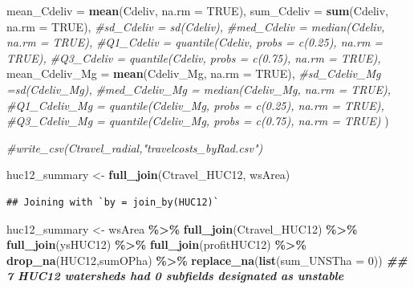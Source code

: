 \documentclass[
]{article}
\newenvironment{Shaded}{\begin{snugshade}}{\end{snugshade}}
\newcommand{\AttributeTok}[1]{\textcolor[rgb]{0.13,0.29,0.53}{#1}}
\newcommand{\CommentTok}[1]{\textcolor[rgb]{0.56,0.35,0.01}{\textit{#1}}}
\newcommand{\ConstantTok}[1]{\textcolor[rgb]{0.56,0.35,0.01}{#1}}
\newcommand{\DecValTok}[1]{\textcolor[rgb]{0.00,0.00,0.81}{#1}}
\newcommand{\DocumentationTok}[1]{\textcolor[rgb]{0.56,0.35,0.01}{\textbf{\textit{#1}}}}
\newcommand{\FunctionTok}[1]{\textcolor[rgb]{0.13,0.29,0.53}{\textbf{#1}}}
\newcommand{\NormalTok}[1]{#1}
\newcommand{\OtherTok}[1]{\textcolor[rgb]{0.56,0.35,0.01}{#1}}
\newcommand{\SpecialCharTok}[1]{\textcolor[rgb]{0.81,0.36,0.00}{\textbf{#1}}}
\begin{document}
\begin{Shaded}
\begin{Highlighting}[]
            \AttributeTok{mean\_Cdeliv =} \FunctionTok{mean}\NormalTok{(Cdeliv, }\AttributeTok{na.rm =} \ConstantTok{TRUE}\NormalTok{),}
            \AttributeTok{sum\_Cdeliv =} \FunctionTok{sum}\NormalTok{(Cdeliv, }\AttributeTok{na.rm =} \ConstantTok{TRUE}\NormalTok{),}
            \CommentTok{\#sd\_Cdeliv = sd(Cdeliv),}
            \CommentTok{\#med\_Cdeliv = median(Cdeliv, na.rm = TRUE),}
            \CommentTok{\#Q1\_Cdeliv = quantile(Cdeliv, probs = c(0.25), na.rm = TRUE),}
            \CommentTok{\#Q3\_Cdeliv = quantile(Cdeliv, probs = c(0.75), na.rm = TRUE),}
            \AttributeTok{mean\_Cdeliv\_Mg =} \FunctionTok{mean}\NormalTok{(Cdeliv\_Mg, }\AttributeTok{na.rm =} \ConstantTok{TRUE}\NormalTok{),}
            \CommentTok{\#sd\_Cdeliv\_Mg =sd(Cdeliv\_Mg),}
            \CommentTok{\#med\_Cdeliv\_Mg = median(Cdeliv\_Mg, na.rm = TRUE),}
            \CommentTok{\#Q1\_Cdeliv\_Mg = quantile(Cdeliv\_Mg, probs = c(0.25), na.rm = TRUE),}
            \CommentTok{\#Q3\_Cdeliv\_Mg = quantile(Cdeliv\_Mg, probs = c(0.75), na.rm = TRUE)}
\NormalTok{  )}

\CommentTok{\#write\_csv(Ctravel\_radial,"travelcosts\_byRad.csv")}
\end{Highlighting}
\end{Shaded}

\begin{Shaded}
\begin{Highlighting}[]
\NormalTok{huc12\_summary }\OtherTok{\textless{}{-}} \FunctionTok{full\_join}\NormalTok{(Ctravel\_HUC12, wsArea)}
\end{Highlighting}
\end{Shaded}

\begin{verbatim}
## Joining with `by = join_by(HUC12)`
\end{verbatim}

\begin{Shaded}
\begin{Highlighting}[]
\NormalTok{huc12\_summary }\OtherTok{\textless{}{-}}\NormalTok{ wsArea }\SpecialCharTok{\%\textgreater{}\%}
  \FunctionTok{full\_join}\NormalTok{(Ctravel\_HUC12) }\SpecialCharTok{\%\textgreater{}\%}
  \FunctionTok{full\_join}\NormalTok{(ysHUC12) }\SpecialCharTok{\%\textgreater{}\%}
  \FunctionTok{full\_join}\NormalTok{(profitHUC12) }\SpecialCharTok{\%\textgreater{}\%}
  \FunctionTok{drop\_na}\NormalTok{(HUC12,sumOPha) }\SpecialCharTok{\%\textgreater{}\%}
  \FunctionTok{replace\_na}\NormalTok{(}\FunctionTok{list}\NormalTok{(}\AttributeTok{sum\_UNSTha =} \DecValTok{0}\NormalTok{)) }\DocumentationTok{\#\# 7 HUC12 watersheds had 0 subfields designated as unstable}
\end{Highlighting}
\end{Shaded}
\end{document}

